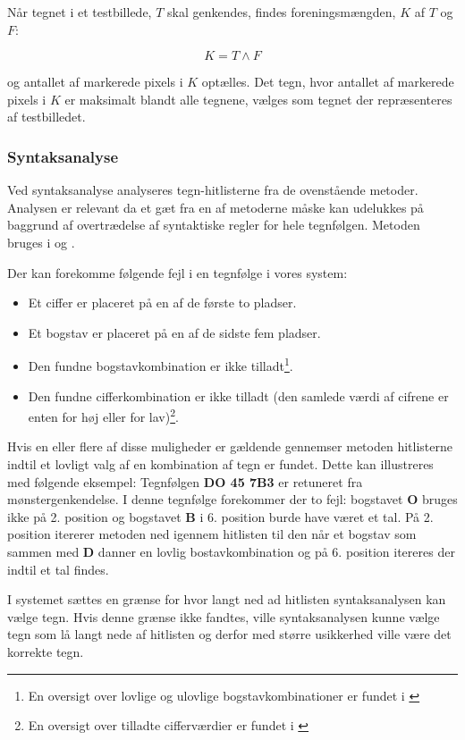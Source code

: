 Når tegnet i et testbillede, $T$ skal genkendes, findes foreningsmængden, $K$ af $T$ og $F$:

\begin{displaymath}
K = T \wedge F
\end{displaymath}

og antallet af markerede pixels i $K$ optælles. Det tegn, hvor antallet af markerede pixels i $K$ er maksimalt blandt alle tegnene, vælges som tegnet der repræsenteres af testbilledet.

\subsubsection*{Syntaksanalyse}

Ved syntaksanalyse analyseres tegn-hitlisterne fra de ovenstående metoder. Analysen er relevant da et gæt fra en af metoderne måske kan udelukkes på baggrund af overtrædelse af syntaktiske regler for hele tegnfølgen. Metoden bruges i \cite{nijhuis} og \cite{kwas}.

Der kan forekomme følgende fejl i en tegnfølge i vores system:

\begin{itemize}
\item Et ciffer er placeret på en af de første to pladser.
\item Et bogstav er placeret på en af de sidste fem pladser.
\item Den fundne bogstavkombination er ikke tilladt\footnote{En oversigt over lovlige og ulovlige bogstavkombinationer er fundet i \cite{bogstav_komb}}.
\item Den fundne cifferkombination er ikke tilladt (den samlede værdi af cifrene er enten for høj eller for lav)\footnote{En oversigt over tilladte cifferværdier er fundet i \cite{nrpl}}.
\end{itemize}

Hvis en eller flere af disse muligheder er gældende gennemser metoden hitlisterne indtil et lovligt valg af en kombination af tegn er fundet. Dette kan illustreres med følgende eksempel: Tegnfølgen \textbf{DO 45 7B3} er retuneret fra mønstergenkendelse. I denne tegnfølge forekommer der to fejl: bogstavet \textbf{O} bruges ikke på 2. position og bogstavet \textbf{B} i 6. position burde have været et tal. På 2. position itererer metoden ned igennem hitlisten til den når et bogstav som sammen med \textbf{D} danner en lovlig bostavkombination og på 6. position itereres der indtil et tal findes.

I systemet sættes en grænse for hvor langt ned ad hitlisten syntaksanalysen kan vælge tegn. Hvis denne grænse ikke fandtes, ville syntaksanalysen kunne vælge tegn som lå langt nede af hitlisten og derfor med større usikkerhed ville være det korrekte tegn.

